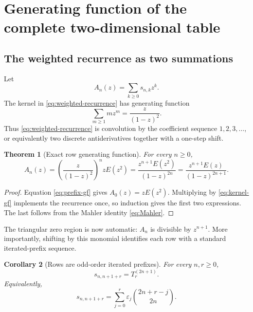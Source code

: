 \documentclass[11pt,oneside]{article}
\numberwithin{equation}{section}
\newtheorem{theorem}{Theorem}[section]
\newtheorem{corollary}[theorem]{Corollary}
\theoremstyle{definition}
\theoremstyle{remark}
\newcommand{\eps}{\varepsilon}
\newcommand{\Prefix}{T}
\begin{document}
\section{Generating function of the complete two-dimensional table}

\subsection{The weighted recurrence as two summations}

Let
\begin{equation}
 A_n(z)=\sum_{k\ge0}s_{n,k}z^k.
 \label{eq:row-gf-definition}
\end{equation}
The kernel in \eqref{eq:weighted-recurrence} has generating function
\begin{equation}
 \sum_{m\ge1}m z^m=\frac{z}{(1-z)^2}.
 \label{eq:kernel-gf}
\end{equation}
Thus \eqref{eq:weighted-recurrence} is convolution by the coefficient sequence
\(1,2,3,\ldots\), or equivalently two discrete antiderivatives together with
a one-step shift.

\begin{theorem}[Exact row generating function]
For every \(n\ge0\),
\begin{equation}
 \boxed{
 A_n(z)=
 \left(\frac{z}{(1-z)^2}\right)^n zE(z^2)
 =\frac{z^{n+1}E(z^2)}{(1-z)^{2n}}
 =\frac{z^{n+1}E(z)}{(1-z)^{2n+1}}.}
 \label{eq:row-gf}
\end{equation}
\end{theorem}

\begin{proof}
Equation \eqref{eq:prefix-gf} gives \(A_0(z)=zE(z^2)\).  Multiplying by
\eqref{eq:kernel-gf} implements the recurrence once, so induction gives the
first two expressions.  The last follows from the Mahler identity
\eqref{eq:Mahler}.
\end{proof}

The triangular zero region is now automatic: \(A_n\) is divisible by
\(z^{n+1}\).  More importantly, shifting by this monomial identifies each row
with a standard iterated-prefix sequence.

\begin{corollary}[Rows are odd-order iterated prefixes]
For every \(n,r\ge0\),
\begin{equation}
 \boxed{s_{n,n+1+r}=\Prefix_r^{(2n+1)}.}
 \label{eq:row-prefix-identification}
\end{equation}
Equivalently,
\begin{equation}
 s_{n,n+1+r}
 =\sum_{j=0}^{r}\eps_j\binom{2n+r-j}{2n}.
 \label{eq:row-prefix-convolution}
\end{equation}
\end{corollary}
\end{document}
